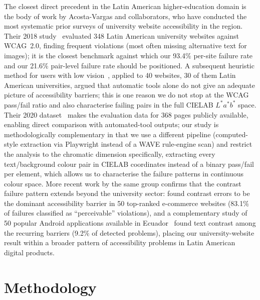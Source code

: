 \documentclass[10pt]{article}
\begin{document}
The closest direct precedent in the Latin American higher-education domain is the body of work by Acosta-Vargas and collaborators, who have conducted the most systematic prior surveys of university website accessibility in the region. Their 2018 study~\citep*{acostavargas2018challenges} evaluated 348 Latin American university websites against WCAG~2.0, finding frequent violations (most often missing alternative text for images); it is the closest benchmark against which our 93.4\% per-site failure rate and our 21.6\% pair-level failure rate should be positioned. A subsequent heuristic method for users with low vision~\citep*{acostavargas2019heuristic}, applied to 40 websites, 30 of them Latin American universities, argued that automatic tools alone do not give an adequate picture of accessibility barriers; this is one reason we do not stop at the WCAG pass/fail ratio and also characterise failing pairs in the full CIELAB \(L^*a^*b^*\) space. Their 2020 dataset~\citep*{acostavargas2020dataset} makes the evaluation data for 368 pages publicly available, enabling direct comparison with automated-tool outputs; our study is methodologically complementary in that we use a different pipeline (computed-style extraction via Playwright instead of a WAVE rule-engine scan) and restrict the analysis to the chromatic dimension specifically, extracting every text/background colour pair in CIELAB coordinates instead of a binary pass/fail per element, which allows us to characterise the failure patterns in continuous colour space. More recent work by the same group confirms that the contrast failure pattern extends beyond the university sector: \citet{acostavargas2022ecommerce} found contrast errors to be the dominant accessibility barrier in 50 top-ranked e-commerce websites (83.1\% of failures classified as ``perceivable'' violations), and a complementary study of 50 popular Android applications available in Ecuador~\citep{acostavargas2021mobile} found text contrast among the recurring barriers (9.2\% of detected problems), placing our university-website result within a broader pattern of accessibility problems in Latin American digital products.

\section{Methodology}
\end{document}
